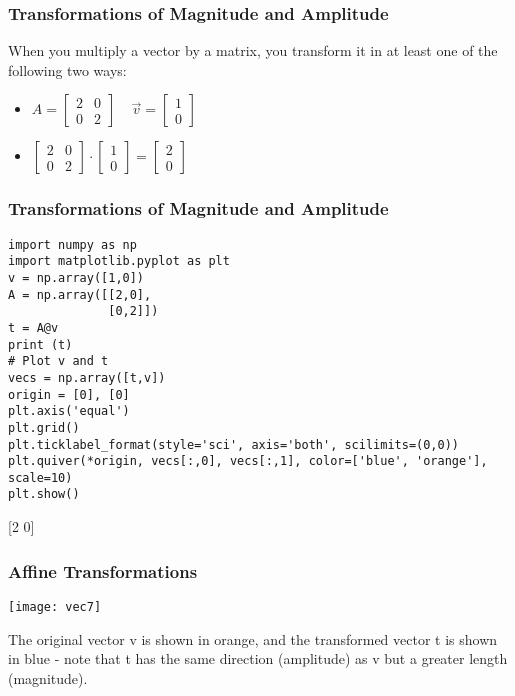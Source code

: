  \begin{frame}[fragile] \frametitle{Transformations of Magnitude and Amplitude}
When you multiply a vector by a matrix, you transform it in at least one of the following two ways:
\begin{itemize}

\item $A = \begin{bmatrix}2 & 0\\0 & 2\end{bmatrix} \;\;\;\; \vec{v} = \begin{bmatrix}1\\0\end{bmatrix}$
\item $\begin{bmatrix}2 & 0\\0 & 2\end{bmatrix} \cdot  \begin{bmatrix}1\\0\end{bmatrix} = \begin{bmatrix}2\\0\end{bmatrix}$
\end{itemize}

\end{frame}

 \begin{frame}[fragile] \frametitle{Transformations of Magnitude and Amplitude}
\begin{lstlisting}
import numpy as np
import matplotlib.pyplot as plt
v = np.array([1,0])
A = np.array([[2,0],
              [0,2]])
t = A@v
print (t)
# Plot v and t
vecs = np.array([t,v])
origin = [0], [0]
plt.axis('equal')
plt.grid()
plt.ticklabel_format(style='sci', axis='both', scilimits=(0,0))
plt.quiver(*origin, vecs[:,0], vecs[:,1], color=['blue', 'orange'], scale=10)
plt.show()
\end{lstlisting}
[2 0]
\end{frame}

 \begin{frame}[fragile] \frametitle{Affine Transformations}


\begin{center}
\texttt{[image: vec7]}
\end{center}
The original vector v is shown in orange, and the transformed vector t is shown in blue - note that t has the same direction (amplitude) as v but a greater length (magnitude).
 
\end{frame}



